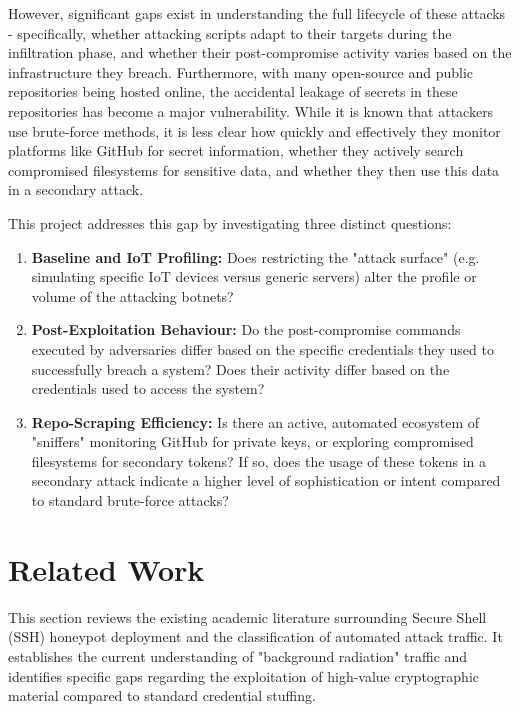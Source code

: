 \documentclass[]{article}
\begin{document}
However, significant gaps exist in understanding the full lifecycle of these attacks - specifically, whether attacking scripts adapt to their targets during the infiltration phase, and whether their post-compromise activity varies based on the infrastructure they breach. Furthermore, with many open-source and public repositories being hosted online, the accidental leakage of secrets in these repositories has become a major vulnerability. While it is known that attackers use brute-force methods, it is less clear how quickly and effectively they monitor platforms like GitHub for secret information, whether they actively search compromised filesystems for sensitive data, and whether they then use this data in a secondary attack.

This project addresses this gap by investigating three distinct questions:

\begin{enumerate}
	\item \textbf{Baseline and IoT Profiling:} Does restricting the "attack surface" (e.g. simulating specific IoT devices versus generic servers) alter the profile or volume of the attacking botnets?
	
	\item \textbf{Post-Exploitation Behaviour:} Do the post-compromise commands executed by adversaries differ based on the specific credentials they used to successfully breach a system? Does their activity differ based on the credentials used to access the system?
	
	\item \textbf{Repo-Scraping Efficiency:} Is there an active, automated ecosystem of "sniffers" monitoring GitHub for private keys, or exploring compromised filesystems for secondary tokens? If so, does the usage of these tokens in a secondary attack indicate a higher level of sophistication or intent compared to standard brute-force attacks?
\end{enumerate}


\section{Related Work}

This section reviews the existing academic literature surrounding Secure Shell (SSH) honeypot deployment and the classification of automated attack traffic. It establishes the current understanding of "background radiation" traffic and identifies specific gaps regarding the exploitation of high-value cryptographic material compared to standard credential stuffing.
\end{document}
